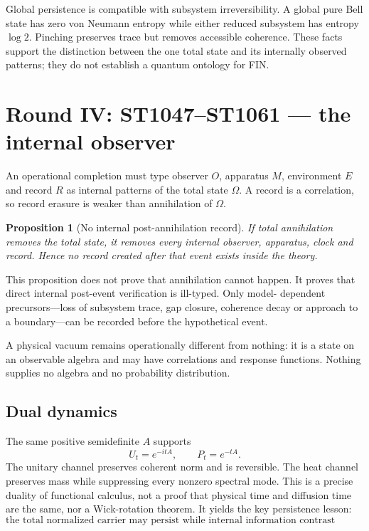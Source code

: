 \documentclass[11pt,a4paper]{article}
\newtheorem{proposition}[theorem]{Proposition}
\begin{document}
Global persistence is compatible with subsystem irreversibility.  A global
pure Bell state has zero von Neumann entropy while either reduced subsystem
has entropy $\log2$.  Pinching preserves trace but removes accessible
coherence.  These facts support the distinction between the one total state
and its internally observed patterns; they do not establish a quantum
ontology for FIN.

\section{Round IV: ST1047--ST1061 --- the internal observer}

An operational completion must type observer $O$, apparatus $M$, environment
$E$ and record $R$ as internal patterns of the total state $\Omega$.  A record
is a correlation, so record erasure is weaker than annihilation of $\Omega$.

\begin{proposition}[No internal post-annihilation record]
If total annihilation removes the total state, it removes every internal
observer, apparatus, clock and record.  Hence no record created after that
event exists inside the theory.
\end{proposition}

This proposition does not prove that annihilation cannot happen.  It proves
that direct internal post-event verification is ill-typed.  Only model-
dependent precursors---loss of subsystem trace, gap closure, coherence decay
or approach to a boundary---can be recorded before the hypothetical event.

A physical vacuum remains operationally different from nothing: it is a state
on an observable algebra and may have correlations and response functions.
Nothing supplies no algebra and no probability distribution.

\subsection{Dual dynamics}

The same positive semidefinite $A$ supports
\[
 U_t=e^{-itA},\qquad P_t=e^{-tA}.
\]
The unitary channel preserves coherent norm and is reversible.  The heat
channel preserves mass while suppressing every nonzero spectral mode.  This
is a precise duality of functional calculus, not a proof that physical time
and diffusion time are the same, nor a Wick-rotation theorem.  It yields the
key persistence lesson:
\[
 \boxed{\text{the total normalized carrier may persist while internal
 information contrast becomes inaccessible.}}
\]
\end{document}
